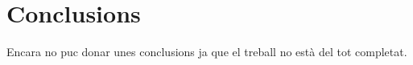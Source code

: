 \thispagestyle{empty}
\section*{Conclusions}

Encara no puc donar unes conclusions ja que el treball no està del tot completat.
